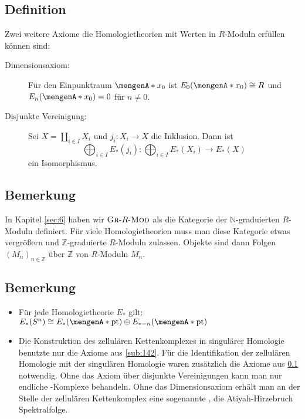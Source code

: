 \subsection[Definition: Dimensionsaxiom und Axiom über disjunkte Vereinigungen]{Definition} %
\label{sub:145}
Zwei weitere Axiome die Homologietheorien mit Werten in $R$-Moduln erfüllen können sind:
\begin{description}
	\item[Dimensionsaxiom:] Für den Einpunktraum $\set{x_0}$ ist $E_0(\set{x_0})\cong R$ und $E_n(\set{x_0})=0$ für $n \not=0$.
	\item[Disjunkte Vereinigung:]  Sei $X = \coprod_{i \in I} X_i$ und $j_i \colon X_i \to X$ die Inklusion. Dann ist 
	\[
		\bigoplus_{i \in I} E_*(j_i) \colon \bigoplus_{i \in I} E_*(X_i) \longrightarrow E_*(X)
	\]
	ein Isomorphismus.
\end{description}

\subsection[Bemerkung: Statt $\mathds{N}$-graduierten Moduln sind oft auch $\mathds{Z}$-graduierte Moduln nötig]{Bemerkung} %
\label{sub:146}
In Kapitel \ref{sec:6} haben wir $\textsc{Gr}\text{-}R\text{-}\textsc{Mod}$ als die Kategorie der $\mathds{N}$-graduierten $R$-Moduln definiert. Für viele Homologietheorien muss man
diese Kategorie etwas vergrößern und $\mathds{Z}$-graduierte $R$-Moduln zulassen. Objekte sind dann Folgen $(M_n)_{n \in \mathds{Z}}$ über $\mathds{Z}$ von $R$-Moduln $M_n$.

\subsection{Bemerkung} %
\label{sub:147}
\begin{itemize}
	\item Für jede Homologietheorie $E_*$ gilt: 
	\(
		E_*(S^n) \cong E_* \enbrace*{\set{\mathrm{pt}}} \oplus E_{*-n} \enbrace*{\set{\mathrm{pt}} }  
	\)
	\item Die Konstruktion des zellulären Kettenkomplexes in singulärer Homologie benutzte nur die Axiome aus \ref{sub:142}. Für die Identifikation der zellulären Homologie 
	mit der singulären Homologie waren zusätzlich die Axiome aus \ref{sub:145} notwendig. Ohne das Axiom über disjunkte Vereinigungen kann man nur endliche \CW-Komplexe 
	behandeln. Ohne das Dimensionsaxiom erhält man an der Stelle der zellulären Kettenkomplex eine sogenannte , die Atiyah-Hirzebruch Spektralfolge. 
\end{itemize}

